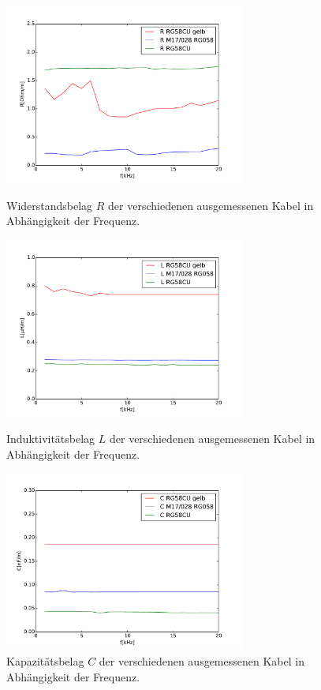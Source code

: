 \begin{figure}
	\begin{minipage}{7.9cm}
		\includegraphics[width = 7.9cm]{data/a/R.pdf}
		\caption[]{Widerstandsbelag $R$ der verschiedenen ausgemessenen Kabel in Abhängigkeit der Frequenz.}
		\label{fig_konst1}
	\end{minipage}
	\begin{minipage}{7.9cm}
		\includegraphics[width = 7.9cm]{data/a/L.pdf}
		\caption[]{Induktivitätsbelag $L$ der verschiedenen ausgemessenen Kabel in Abhängigkeit der Frequenz.}
		\label{fig_konst2}
	\end{minipage}
	\begin{minipage}{7.9cm}
		\includegraphics[width = 7.9cm]{data/a/C.pdf}
		\caption[]{Kapazitätsbelag $C$ der verschiedenen ausgemessenen Kabel in Abhängigkeit der Frequenz.}

\end{minipage}
\end{figure}
